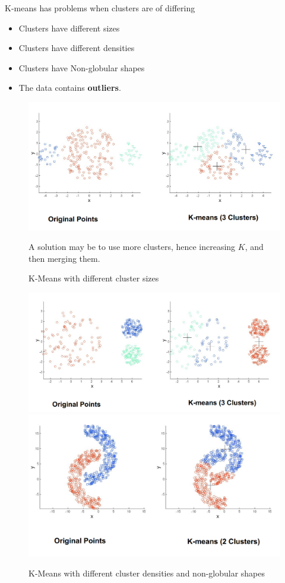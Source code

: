 \begin{paracol}{2}
	\colfill
	K-means has problems when clusters are of differing
	\begin{itemize}
		\item Clusters have different sizes
		\item Clusters have different densities
		\item Clusters have Non-globular shapes
		\item The data contains \textbf{outliers}.
	\end{itemize}
	\colfill
	\switchcolumn
	\begin{figure}[htbp]
		\centering
		\includegraphics[width=0.9\columnwidth]{images/04/kproblems.png}
		\caption{K-Means with different cluster sizes}
		A solution may be to use more clusters, hence increasing $K$, and then merging them.
		\label{fig:04/kproblems}
	\end{figure}

\end{paracol}

\begin{figure}[htbp]
	\centering
	\includegraphics[width=0.48\columnwidth]{images/04/kdensity.png}
	\includegraphics[width=0.48\columnwidth]{images/04/kglobular.png}
	\caption{K-Means with different cluster densities and non-globular shapes}
	\label{fig:04/kdensity}
\end{figure}

